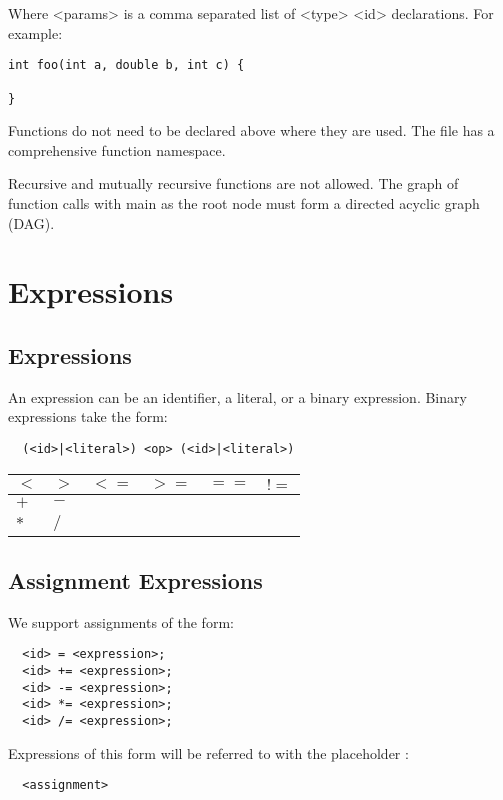 \documentclass[11pt, oneside]{article}   	%
\begin{document}
Where <params> is a comma separated list of <type> <id> declarations. For example: 

\begin{lstlisting}
int foo(int a, double b, int c) {

}
\end{lstlisting}

Functions do not need to be declared above where they are used. The file has a comprehensive function namespace.

Recursive and mutually recursive functions are not allowed. The graph of function calls with main as the root node must form a directed acyclic graph (DAG).

\section{Expressions}
\subsection{Expressions}

An expression can be an identifier, a literal, or a binary expression.
Binary expressions take the form:
\begin{lstlisting}
  (<id>|<literal>) <op> (<id>|<literal>)
\end{lstlisting}

\begin{center}
\begin{tabular}{|l l l l l l|}
\hline
$<$ & $>$ & $<=$ & $>=$ & $==$ & $!=$ \\
\hline
$+$ & $-$ \\
\hline
$*$ & $/$ \\
\hline
\end{tabular}
\end{center}

\subsection{Assignment Expressions}

We support assignments of the form:
\begin{lstlisting}
  <id> = <expression>;
  <id> += <expression>;
  <id> -= <expression>;
  <id> *= <expression>;
  <id> /= <expression>;
\end{lstlisting}
Expressions of this form will be referred to with the placeholder :
\begin{lstlisting}
  <assignment>
\end{lstlisting}
\end{document}
